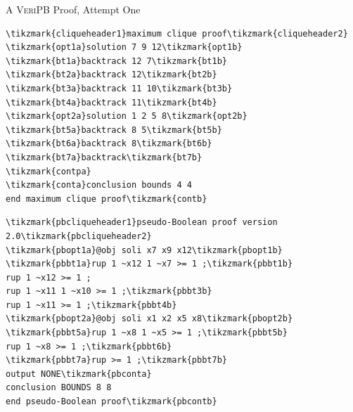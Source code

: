 \documentclass[aspectratio=169,compress,10pt]{beamer}
\makeatletter
\newcommand{\proofsystemformat}[1]{\textsc{#1}\@}
\newcommand{\veripb}{\proofsystemformat{VeriPB}\xspace}
\makeatother
\begin{document}
\begin{frame}[fragile,t]{A \veripb Proof, Attempt One}
\begin{minipage}{0.35\textwidth}
\begin{Verbatim}[commandchars=\\\{\},codes={\catcode`$=3\catcode`^=7}]
\tikzmark{cliqueheader1}maximum clique proof\tikzmark{cliqueheader2}
\tikzmark{opt1a}solution 7 9 12\tikzmark{opt1b}
\tikzmark{bt1a}backtrack 12 7\tikzmark{bt1b}
\tikzmark{bt2a}backtrack 12\tikzmark{bt2b}
\tikzmark{bt3a}backtrack 11 10\tikzmark{bt3b}
\tikzmark{bt4a}backtrack 11\tikzmark{bt4b}
\tikzmark{opt2a}solution 1 2 5 8\tikzmark{opt2b}
\tikzmark{bt5a}backtrack 8 5\tikzmark{bt5b}
\tikzmark{bt6a}backtrack 8\tikzmark{bt6b}
\tikzmark{bt7a}backtrack\tikzmark{bt7b}
\tikzmark{contpa}
\tikzmark{conta}conclusion bounds 4 4
end maximum clique proof\tikzmark{contb}
\end{Verbatim}
\end{minipage}\begin{minipage}{0.45\textwidth}
\begin{Verbatim}[commandchars=\\\{\},codes={\catcode`$=3\catcode`^=7}]
\tikzmark{pbcliqueheader1}pseudo-Boolean proof version 2.0\tikzmark{pbcliqueheader2}
\tikzmark{pbopt1a}@obj soli x7 x9 x12\tikzmark{pbopt1b}
\tikzmark{pbbt1a}rup 1 ~x12 1 ~x7 >= 1 ;\tikzmark{pbbt1b}
rup 1 ~x12 >= 1 ;
rup 1 ~x11 1 ~x10 >= 1 ;\tikzmark{pbbt3b}
rup 1 ~x11 >= 1 ;\tikzmark{pbbt4b}
\tikzmark{pbopt2a}@obj soli x1 x2 x5 x8\tikzmark{pbopt2b}
\tikzmark{pbbt5a}rup 1 ~x8 1 ~x5 >= 1 ;\tikzmark{pbbt5b}
rup 1 ~x8 >= 1 ;\tikzmark{pbbt6b}
\tikzmark{pbbt7a}rup >= 1 ;\tikzmark{pbbt7b}
output NONE\tikzmark{pbconta}
conclusion BOUNDS 8 8
end pseudo-Boolean proof\tikzmark{pbcontb}
\end{Verbatim}
\end{minipage}%
\end{frame}
\end{document}

